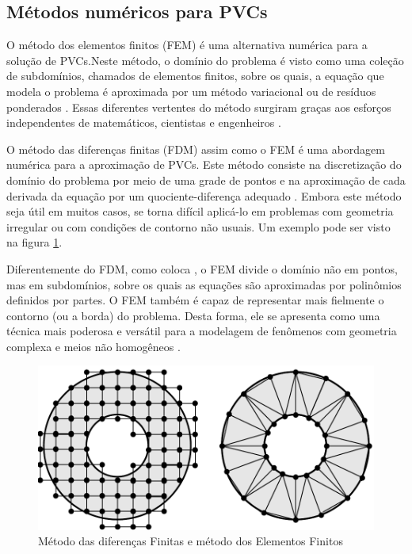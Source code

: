 \documentclass[
    12pt,               %
    openright,          %
    oneside,
    a4paper,            %
    english,            %
    french,             %
    spanish,            %
    brazil              %
    ]{abntex2}
\begin{document}
\subsection{Métodos numéricos para PVCs}
\label{sec:FEM}

O método dos elementos finitos (FEM) é uma alternativa numérica para a solução de PVCs.Neste método, o domínio do problema é visto como uma coleção de subdomínios, chamados de elementos finitos, sobre os quais, a equação que modela o problema é aproximada por um método variacional ou de resíduos ponderados . Essas diferentes vertentes do método surgiram graças aos esforços independentes de matemáticos, cientistas e engenheiros \cite{zien}. 

O método das diferenças finitas (FDM) assim como o FEM é uma abordagem numérica para a aproximação de PVCs. Este método consiste na discretização do domínio do problema por meio de uma grade de pontos e na aproximação de cada derivada da equação por um quociente-diferença adequado
\cite{burdenFaires}. Embora este método seja útil em muitos casos, se torna difícil aplicá-lo em problemas com geometria irregular ou com condições de contorno não usuais. Um exemplo pode ser visto na figura \ref{fig:mdfFem}.

Diferentemente do FDM, como coloca , o FEM divide o domínio não em pontos, mas em subdomínios, sobre os quais as equações são aproximadas por polinômios definidos por partes. O FEM também é capaz de representar mais fielmente o contorno (ou a borda) do problema. Desta forma, ele se apresenta como uma técnica mais poderosa e versátil para a modelagem de fenômenos com geometria complexa e meios não homogêneos \cite{sadiku}. 

\begin{figure}[!htb]
	\centering
	\includegraphics[scale=0.5]{figuras/fdm_fem.pdf}
	\caption{Método das diferenças Finitas e método dos Elementos Finitos}
	\label{fig:mdfFem}
\end{figure}
\end{document}
